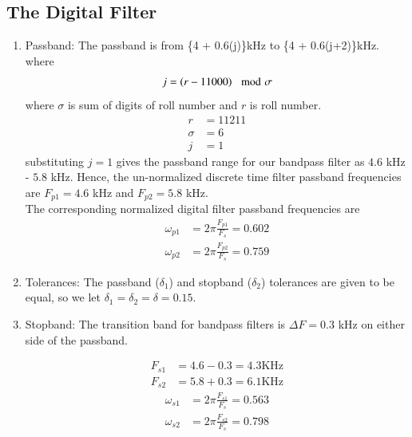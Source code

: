 \documentclass{article}
\begin{document}
\subsection{The Digital Filter}
\begin{enumerate}
    \item {Passband:}
     The passband is from \{4 + 0.6(j)\}kHz to \{4 + 0.6(j+2)\}kHz. \\
  where 
  \begin{align}
  j=\left(r-11000\right) \mod \sigma
 \end{align}
 where $\sigma$ is sum of digits of roll number and $r$ is roll number.\\
 \begin{align}
              r      & =11211 \\
              \sigma & = 6   \\
              j      & =1
          \end{align}
          substituting $j =1$ gives the passband
          range for our bandpass filter as $4.6$ kHz - $5.8$ kHz.  Hence, the un-normalized discrete time filter
          passband frequencies are $F_{p1} = 4.6$ kHz
          and $F_{p2} = 5.8$ kHz. \\
          The corresponding normalized digital filter passband frequencies are
          \begin{align}
              \omega_{p1} & = 2\pi\frac{F_{p1}}{F_s} = 0.602  \\
              \omega_{p2} & = 2\pi\frac{F_{p2}}{F_s}  = 0.759
          \end{align}
          
    \item {Tolerances:}  The passband ($\delta_1$) and stopband ($\delta_2$) tolerances are given to
          be equal, so we let $\delta_1 = \delta_2 = \delta = 0.15$.
          
    \item { Stopband:}  The {transition band} for bandpass filters is $\Delta F = 0.3$ kHz on either side of the passband.
          
          \begin{align}
              F_{s1} & = 4.6-0.3 = 4.3 \text{KHz}  \\
              F  _{s2} & = 5.8+0.3 = 6.1 \text{KHz}
          \end{align}
          \begin{align}
              \omega_{s1} & = 2\pi\frac{F_{s1}}{F_s} = 0.563 \\
              \omega_{s2} & = 2\pi\frac{F_{s2}}{F_s} = 0.798 \\
          \end{align}
\end{enumerate}
\end{document}

